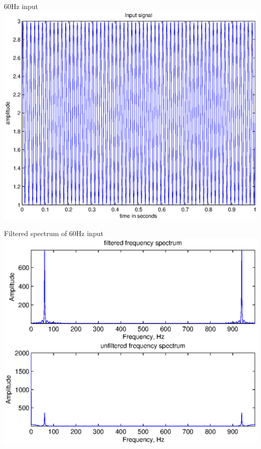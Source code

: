 \documentclass[mathserif]{beamer}
\begin{document}
    \begin{frame}{60Hz input}
      \includegraphics[width=\linewidth]{inputSig60Hz}
    \end{frame}
    
    
    \begin{frame}{Filtered spectrum of 60Hz input}
      \includegraphics[width=\linewidth]{freqSpec60Hz}
    \end{frame}
\end{document}
